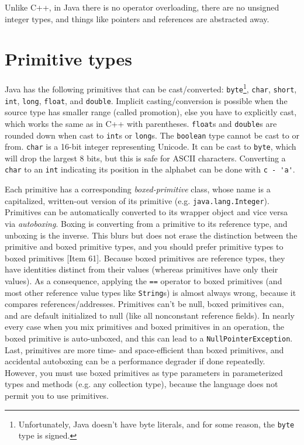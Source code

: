 \documentclass[8pt, table, xcdraw]{article}%
\begin{document}
Unlike C++, in Java there is no operator overloading, there are no unsigned integer types, and things like pointers and references are abstracted away.

\section{Primitive types}

Java has the following primitives that can be cast/converted: \lstinline{byte}\footnote{Unfortunately, Java doesn't have byte literals, and for some reason, the \lstinline{byte} type is signed.}, \lstinline{char}, \lstinline{short}, \lstinline{int}, \lstinline{long}, \lstinline{float}, and \lstinline{double}. Implicit casting/conversion is possible when the source type has smaller range (called promotion), else you have to explicitly cast, which works the same as in C++ with parentheses. \lstinline{float}s and \lstinline{double}s are rounded down when cast to \lstinline{int}s or \lstinline{long}s. The \lstinline{boolean} type cannot be cast to or from. \lstinline{char} is a 16-bit integer representing Unicode. It can be cast to \lstinline{byte}, which will drop the largest 8 bits, but this is safe for ASCII characters. Converting a \lstinline{char} to an \lstinline{int} indicating its position in the alphabet can be done with \lstinline{c - 'a'}.

Each primitive has a corresponding \emph{boxed-primitive} class, whose name is a capitalized, written-out version of its primitive (e.g. \lstinline{java.lang.Integer}). Primitives can be automatically converted to its wrapper object and vice versa via \emph{autoboxing}. Boxing is converting from a primitive to its reference type, and unboxing is the inverse. This blurs but does not erase the distinction between the primitive and boxed primitive types, and you should prefer primitive types to boxed primitives [Item 61]. Because boxed primitives are reference types, they have identities distinct from their values (whereas primitives have only their values). As a consequence, applying the \lstinline{==} operator to boxed primitives (and most other reference value types like \lstinline{String}s) is almost always wrong, because it compares references/addresses. Primitives can't be null, boxed primitives can, and are default initialized to null (like all nonconstant reference fields). In nearly every case when you mix primitives and boxed primitives in an operation, the boxed primitive is auto-unboxed, and this can lead to a \lstinline{NullPointerException}. Last, primitives are more time- and space-efficient than boxed primitives, and accidental autoboxing can be a performance degrader if done repeatedly. However, you must use boxed primitives as type parameters in parameterized types and methods (e.g. any collection type), because the language does not permit you to use primitives.
 
\end{document}
